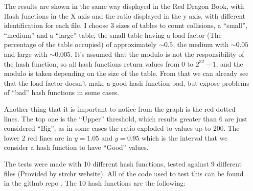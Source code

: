 The results are shown in the same way displayed in the Red Dragon Book, with Hash functions in the X axis and the ratio displayed in the y axis, with different identification for each file. I choose 3 sizes of tables to count collisions, a ``small'', ``medium'' and a ``large'' table, the small table having a load factor (The percentage of the table occupied) of approximately \( \sim 0.5 \), the medium with \( \sim 0.05 \) and large with \( \sim 0.005 \). It's assumed that the modulo is not the responsibility of the hash function, so all hash functions return values from 0 to \( 2^{32} - 1 \), and the modulo is taken depending on the size of the table. From that we can already see that the load factor doesn't make a good hash function bad, but expose problems of ``bad'' hash functions in some cases. 

Another thing that it is important to notice from the graph is the red dotted lines. The top one is the ``Upper'' threshold, which results greater than 6 are just considered ``Big'', as in some cases the ratio exploded to values up to 200. The lower 2 red lines are in \( y = 1.05 \) and \( y = 0.95 \) which is the interval that we consider a hash function to have ``Good'' values. 

The tests were made with 10 different hash functions, tested against 9 different files (Provided by strchr website). All of the code used to test this can be found in the github repo \citep{GithubRepo}. The 10 hash functions are the following:

